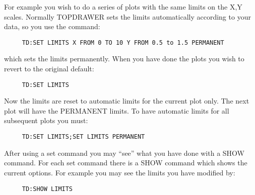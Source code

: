 For  example  you  wish to do a series of plots with the same limits on
the X,Y scales.   Normally  TOPDRAWER  sets  the  limits  automatically
according to your data, so you use the command:  
\begin{verbatim}
     TD:SET LIMITS X FROM 0 TO 10 Y FROM 0.5 to 1.5 PERMANENT 
\end{verbatim}
which  sets  the  limits permanently.  When you have done the plots you
wish to revert to the original default:  
\begin{verbatim}
     TD:SET LIMITS 
\end{verbatim}
Now the limits are reset to automatic limits for the current plot only.
The next plot will have the PERMANENT limits.  To have automatic limits
for all subsequent plots you must:  
\begin{verbatim}
     TD:SET LIMITS;SET LIMITS PERMANENT 
\end{verbatim}

After  using a set command you may ``see'' what you have done with a SHOW
command.  For each set command there is a SHOW command which shows  the
current  options.  For example you may see the limits you have modified
by:  
\begin{verbatim}
     TD:SHOW LIMITS 
\end{verbatim}
